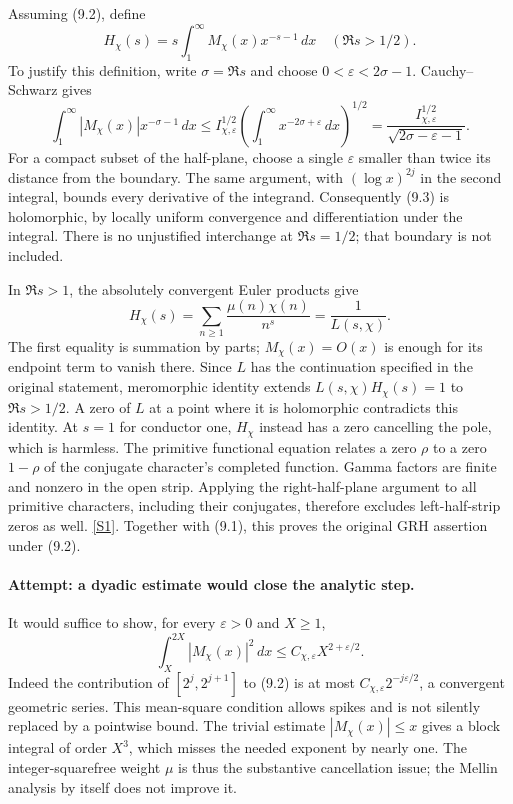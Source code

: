 \documentclass[11pt,a4paper]{article}
\newcommand{\sref}[2]{\hyperlink{source:#1:#2}{[S#2]}}
\begin{document}
Assuming (9.2), define
\[
 H_\chi(s)=s\int_1^\infty M_\chi(x)x^{-s-1}\,dx
                  \quad(\Re s>1/2). \tag{9.3}
\]
To justify this definition, write $\sigma=\Re s$ and choose
$0<\varepsilon<2\sigma-1$. Cauchy--Schwarz gives
\[
 \int_1^\infty |M_\chi(x)|x^{-\sigma-1}\,dx
 \leq I_{\chi,\varepsilon}^{1/2}
       \left(\int_1^\infty x^{-2\sigma+\varepsilon}\,dx\right)^{1/2}
 =\frac{I_{\chi,\varepsilon}^{1/2}}{
                    \sqrt{2\sigma-\varepsilon-1}}. \tag{9.4}
\]
For a compact subset of the half-plane, choose a single $\varepsilon$
smaller than twice its distance from the boundary. The same argument,
with $(\log x)^{2j}$ in the second integral, bounds every derivative of
the integrand. Consequently (9.3) is holomorphic, by locally uniform
convergence and differentiation under the integral. There is no
unjustified interchange at $\Re s=1/2$; that boundary is not included.

In $\Re s>1$, the absolutely convergent Euler products give
\[
 H_\chi(s)=\sum_{n\geq1}\frac{\mu(n)\chi(n)}{n^s}
          =\frac1{L(s,\chi)}. \tag{9.5}
\]
The first equality is summation by parts; $M_\chi(x)=O(x)$ is enough
for its endpoint term to vanish there. Since $L$ has the continuation
specified in the original statement, meromorphic identity extends
$L(s,\chi)H_\chi(s)=1$ to $\Re s>1/2$. A zero of $L$ at a point where
it is holomorphic contradicts this identity. At $s=1$ for conductor one,
$H_\chi$ instead has a zero cancelling the pole, which is harmless.
The primitive functional equation relates a zero $\rho$ to a zero
$1-\rho$ of the conjugate character's completed function. Gamma factors
are finite and nonzero in the open strip. Applying the right-half-plane
argument to all primitive characters, including their conjugates,
therefore excludes left-half-strip zeros as well. \sref{statement}{1}.
Together with (9.1), this proves the original GRH assertion under (9.2).

\paragraph{Attempt: a dyadic estimate would close the analytic step.}
It would suffice to show, for every $\varepsilon>0$ and $X\geq1$,
\[
 \int_X^{2X}|M_\chi(x)|^2\,dx
       \leq C_{\chi,\varepsilon}X^{2+\varepsilon/2}. \tag{9.6}
\]
Indeed the contribution of $[2^j,2^{j+1}]$ to (9.2) is at most
$C_{\chi,\varepsilon}2^{-j\varepsilon/2}$, a convergent geometric
series. This mean-square condition allows spikes and is not silently
replaced by a pointwise bound. The trivial estimate $|M_\chi(x)|\leq x$
gives a block integral of order $X^3$, which misses the needed exponent
by nearly one. The integer-squarefree weight $\mu$ is thus the substantive
cancellation issue; the Mellin analysis by itself does not improve it.
\end{document}
